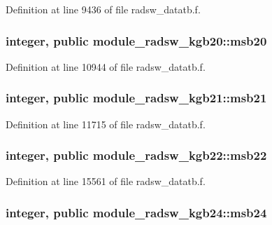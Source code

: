 Definition at line 9436 of file radsw\+\_\+datatb.\+f.

\subsubsection[{\texorpdfstring{msb20}{msb20}}]{\setlength{\rightskip}{0pt plus 5cm}integer, public module\+\_\+radsw\+\_\+kgb20\+::msb20}\hypertarget{group__module__radsw__main_ga385f5b8c61ed1de7aa3bbb6bd65f522f}{}\label{group__module__radsw__main_ga385f5b8c61ed1de7aa3bbb6bd65f522f}


Definition at line 10944 of file radsw\+\_\+datatb.\+f.

\subsubsection[{\texorpdfstring{msb21}{msb21}}]{\setlength{\rightskip}{0pt plus 5cm}integer, public module\+\_\+radsw\+\_\+kgb21\+::msb21}\hypertarget{group__module__radsw__main_ga59710ca5b31c30385ea968c0f01e2e81}{}\label{group__module__radsw__main_ga59710ca5b31c30385ea968c0f01e2e81}


Definition at line 11715 of file radsw\+\_\+datatb.\+f.

\subsubsection[{\texorpdfstring{msb22}{msb22}}]{\setlength{\rightskip}{0pt plus 5cm}integer, public module\+\_\+radsw\+\_\+kgb22\+::msb22}\hypertarget{group__module__radsw__main_ga3398f8d12ec0349b44197873ac58fd98}{}\label{group__module__radsw__main_ga3398f8d12ec0349b44197873ac58fd98}


Definition at line 15561 of file radsw\+\_\+datatb.\+f.

\subsubsection[{\texorpdfstring{msb24}{msb24}}]{\setlength{\rightskip}{0pt plus 5cm}integer, public module\+\_\+radsw\+\_\+kgb24\+::msb24}\hypertarget{group__module__radsw__main_ga0ec09b4df9fbfa868844ad93a84cbe31}{}\label{group__module__radsw__main_ga0ec09b4df9fbfa868844ad93a84cbe31}


